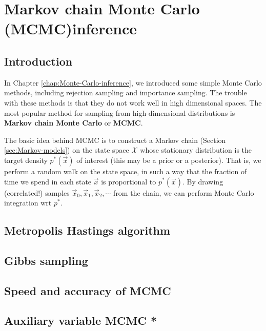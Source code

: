 \chapter{Markov chain Monte Carlo (MCMC)inference}


\section{Introduction}
In Chapter \ref{chap:Monte-Carlo-inference}, we introduced some simple Monte Carlo methods, including rejection sampling and importance sampling. The trouble with these methods is that they do not work well in high dimensional spaces. The most popular method for sampling from high-dimensional distributions is \textbf{Markov chain Monte Carlo} or \textbf{MCMC}.

The basic idea behind MCMC is to construct a Markov chain (Section \ref{sec:Markov-models}) on the state space $\mathcal{X}$ whose stationary distribution is the target density $p^*(\vec{x})$ of interest (this may be a prior or a posterior). That is, we perform a random walk on the state space, in such a way that the fraction of time we spend in each state $\vec{x}$ is proportional to $p^*(\vec{x})$. By drawing (correlated!) samples $\vec{x}_0, \vec{x}_1, \vec{x}_2, \cdots$ from the chain, we can perform Monte Carlo integration wrt $p^*$.


\section{Metropolis Hastings algorithm}


\section{Gibbs sampling}


\section{Speed and accuracy of MCMC}


\section{Auxiliary variable MCMC *}

